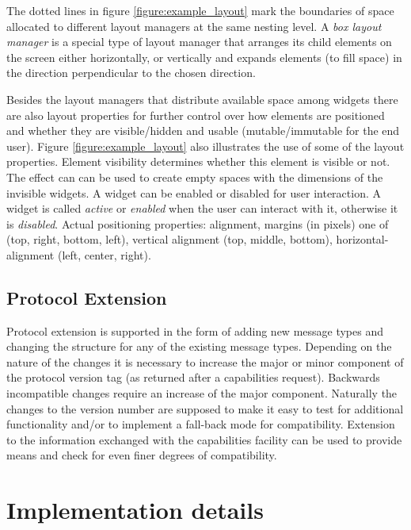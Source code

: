 \documentclass{article}
\begin{document}
    \noindent The dotted lines in figure \ref{figure:example_layout} mark the
    boundaries of space allocated to different layout managers at the same
    nesting level. A \textit{box layout manager} is a special type of layout
    manager that arranges its child elements on the screen either horizontally,
    or vertically and expands elements (to fill space) in the direction
    perpendicular to the chosen direction.
   
    Besides the layout managers that distribute available space among widgets
    there are also layout properties for further control over how elements are
    positioned and whether they are visible/hidden and usable
    (mutable/immutable for the end user).  Figure \ref{figure:example_layout}
    also illustrates the use of some of the layout properties.  Element
    visibility determines whether this element is visible or not. The effect
    can can be used to create empty spaces with the dimensions of the invisible
    widgets.  A widget can be enabled or disabled for user interaction. A
    widget is called \textit{active} or \textit{enabled} when the user can
    interact with it, otherwise it is \textit{disabled}. Actual positioning
    properties: alignment, margins (in pixels) one of (top, right, bottom,
    left), vertical alignment (top, middle, bottom), horizontal-alignment
    (left, center, right).
    
  \subsection{Protocol Extension}

   Protocol extension is supported in the form of adding new message types and
   changing the structure for any of the existing message types. Depending on
   the nature of the changes it is necessary to increase the major or minor
   component of the protocol version tag (as returned after a capabilities
   request).  Backwards incompatible changes require an increase of the major
   component. Naturally the changes to the version number are supposed to make
   it easy to test for additional functionality and/or to implement a fall-back
   mode for compatibility.  Extension to the information exchanged with the
   capabilities facility can be used to provide means and check for even finer
   degrees of compatibility.
   

 \section{Implementation details} \label{s:protocol_implementation}
\end{document}
